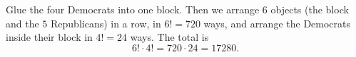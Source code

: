 Glue the four Democrats into one block. Then we arrange $6$ objects (the block and the $5$ Republicans) in a row, in $6!=720$ ways, and arrange the Democrats inside their block in $4!=24$ ways. The total is
\[
6!\cdot4!=720\cdot24=\boxed{17280}.
\]
